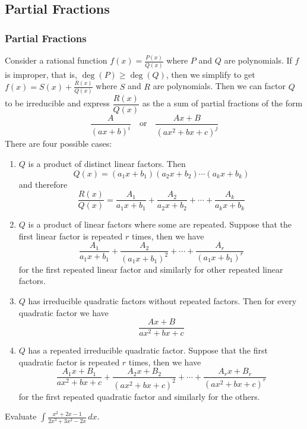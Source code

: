 \subsection{Partial Fractions}

\subsubsection*{Partial Fractions}
Consider a rational function \(\displaystyle{f(x)=\frac{P(x)}{Q(x)}}\) where
\(P\) and \(Q\) are polynomials.
If \(f\) is improper, that is, \(\deg(P)\geq\deg(Q)\), then we simplify to get
\(\displaystyle{f(x)=S(x)+\frac{R(x)}{Q(x)}}\) where \(S\) and \(R\) are
polynomials.
Then we can factor \(Q\) to be irreducible and express \(\dfrac{R(x)}{Q(x)}\)
as the a sum of partial fractions of the form
\[\frac{A}{(ax+b)^i}\quad\text{or}\quad\frac{Ax+B}{(ax^2+bx+c)^j}\]
There are four possible cases:
\begin{enumerate}
    \item \(Q\) is a product of distinct linear factors.
    Then
    \[Q(x)=(a_1 x+b_1)(a_2 x+b_2)\cdots(a_k x+b_k)\]
    and therefore
    \[\frac{R(x)}{Q(x)}=\frac{A_1}{a_1 x+b_1}+\frac{A_2}{a_2 x+b_2}+\cdots+
    \frac{A_k}{a_k x+b_k}\]
    \item \(Q\) is a product of linear factors where some are repeated.
    Suppose that the first linear factor is repeated \(r\) times, then we have
    \[\frac{A_1}{a_1 x+b_1}+\frac{A_2}{(a_1 x+b_1)^2}+\cdots+
    \frac{A_r}{(a_1 x+b_1)^r}\]
    for the first repeated linear factor and similarly for other repeated
    linear factors.
    \item \(Q\) has irreducible quadratic factors without repeated
    factors.
    Then for every quadratic factor we have
    \[\frac{Ax+B}{ax^2+bx+c}\]
    \item \(Q\) has a repeated irreducible quadratic factor.
    Suppose that the first quadratic factor is repeated \(r\) times,
    then we have
    \[\frac{A_1 x+B_1}{ax^2+bx+c}+\frac{A_2 x+B_2}{(ax^2+bx+c)^2}+\cdots
    +\frac{A_r x+B_r}{(ax^2+bx+c)^r}\]
    for the first repeated quadratic factor and similarly for the others.
\end{enumerate}
\begin{problem}
    Evaluate \(\displaystyle{\int\frac{x^2+2x-1}{2x^3+3x^2-2x}\,dx}\).
\end{problem}
